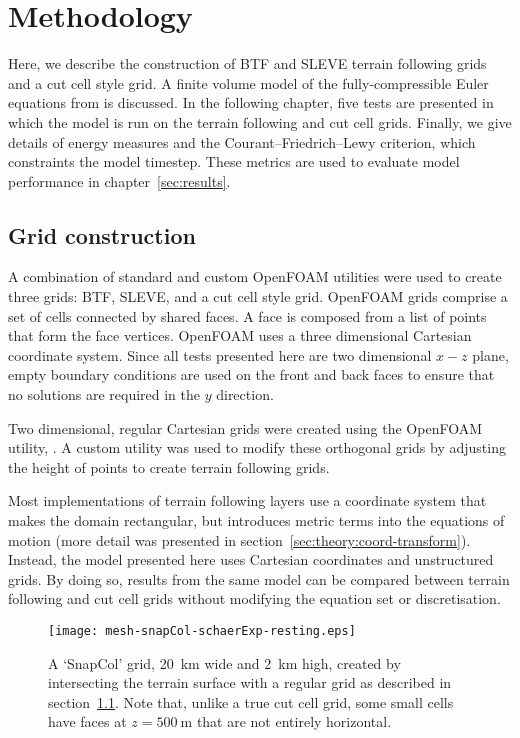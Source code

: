 \chapter{Methodology}
\label{sec:method}

Here, we describe the construction of BTF and SLEVE terrain following grids and a cut cell style grid.  A finite volume model of the fully-compressible Euler equations from \textcite{weller-shahrokhi2014} is discussed.  In the following chapter, five tests are presented in which the model is run on the terrain following and cut cell grids.  Finally, we give details of energy measures and the Courant--Friedrich--Lewy criterion, which constraints the model timestep.  These metrics are used to evaluate model performance in chapter~\ref{sec:results}.

\section{Grid construction}
\label{sec:method:grid}

A combination of standard and custom OpenFOAM utilities were used to create three grids: BTF, SLEVE, and a cut cell style grid.  OpenFOAM grids comprise a set of cells connected by shared faces.  A face is composed from a list of points that form the face vertices.
OpenFOAM uses a three dimensional Cartesian coordinate system.  Since all tests presented here are two dimensional $x-z$ plane, empty boundary conditions are used on the front and back faces to ensure that no solutions are required in the $y$ direction.

Two dimensional, regular Cartesian grids were created using the OpenFOAM utility, .  A custom utility was used to modify these orthogonal grids by adjusting the height of points to create terrain following grids.

Most implementations of terrain following layers use a coordinate system that makes the domain rectangular, but introduces metric terms into the equations of motion (more detail was presented in section~\ref{sec:theory:coord-transform}).  Instead, the model presented here uses Cartesian coordinates and unstructured grids.  By doing so, results from the same model can be compared between terrain following and cut cell grids without modifying the equation set or discretisation.

\begin{figure}
\centerfloat
\texttt{[image: mesh-snapCol-schaerExp-resting.eps]}
\caption{A `SnapCol' grid, \SI{20}{\kilo\meter} wide and \SI{2}{\kilo\meter} high, created by intersecting the terrain surface with a regular grid as described in section~\ref{sec:method:grid}.  Note that, unlike a true cut cell grid, some small cells have faces at $z = \SI{500}{\meter}$ that are not entirely horizontal.}
\label{fig:method:cut-cell}
\end{figure}


